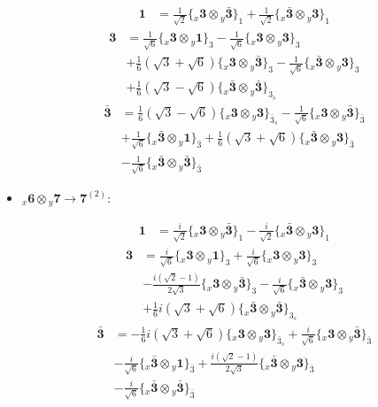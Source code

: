 \documentclass[english]{article}
\newcommand{\rep}[1]{\mathbf{#1}}
\newcommand{\repx}[2]{{}_{#2}\mathbf{#1}}
\newcommand{\tsprodx}[2]{\repx{#1}{x}\otimes\repx{#2}{y}}
\newcommand{\subcgt}[3]{\big\{ \tsprodx{#1}{#2}\big\}^{}_{#3}}
\begin{document}
\begin{itemize}
\begin{fleqn}
\begin{align*}
\rep{1} & = \frac{1}{\sqrt{2}}\subcgt{3}{\bar{3}}{1}+\frac{1}{\sqrt{2}}\subcgt{\bar{3}}{3}{1}
\end{align*}
\begin{align*}
\rep{3} & = \frac{1}{\sqrt{6}}\subcgt{3}{1}{3}-\frac{1}{\sqrt{6}}\subcgt{3}{3}{3} \\ 
 & +\frac{1}{6} \left(\sqrt{3}+\sqrt{6}\right)\subcgt{3}{\bar{3}}{3}-\frac{1}{\sqrt{6}}\subcgt{\bar{3}}{3}{3} \\ 
 & +\frac{1}{6} \left(\sqrt{3}-\sqrt{6}\right)\subcgt{\bar{3}}{\bar{3}}{3_{s}}
\end{align*}
\begin{align*}
\rep{\bar{3}} & = \frac{1}{6} \left(\sqrt{3}-\sqrt{6}\right)\subcgt{3}{3}{\bar{3}_{s}}-\frac{1}{\sqrt{6}}\subcgt{3}{\bar{3}}{\bar{3}} \\ 
 & +\frac{1}{\sqrt{6}}\subcgt{\bar{3}}{1}{\bar{3}}+\frac{1}{6} \left(\sqrt{3}+\sqrt{6}\right)\subcgt{\bar{3}}{3}{\bar{3}} \\ 
 & -\frac{1}{\sqrt{6}}\subcgt{\bar{3}}{\bar{3}}{\bar{3}}
\end{align*}
\end{fleqn}
\item $\tsprodx{6}{7}\to\rep{7}^{(2)}$:
\begin{fleqn}
\begin{align*}
\rep{1} & = \frac{i}{\sqrt{2}}\subcgt{3}{\bar{3}}{1}-\frac{i}{\sqrt{2}}\subcgt{\bar{3}}{3}{1}
\end{align*}
\begin{align*}
\rep{3} & = \frac{i}{\sqrt{6}}\subcgt{3}{1}{3}+\frac{i}{\sqrt{6}}\subcgt{3}{3}{3} \\ 
 & -\frac{i \left(\sqrt{2}-1\right)}{2 \sqrt{3}}\subcgt{3}{\bar{3}}{3}-\frac{i}{\sqrt{6}}\subcgt{\bar{3}}{3}{3} \\ 
 & +\frac{1}{6} i \left(\sqrt{3}+\sqrt{6}\right)\subcgt{\bar{3}}{\bar{3}}{3_{s}}
\end{align*}
\begin{align*}
\rep{\bar{3}} & = -\frac{1}{6} i \left(\sqrt{3}+\sqrt{6}\right)\subcgt{3}{3}{\bar{3}_{s}}+\frac{i}{\sqrt{6}}\subcgt{3}{\bar{3}}{\bar{3}} \\ 
 & -\frac{i}{\sqrt{6}}\subcgt{\bar{3}}{1}{\bar{3}}+\frac{i \left(\sqrt{2}-1\right)}{2 \sqrt{3}}\subcgt{\bar{3}}{3}{\bar{3}} \\ 
 & -\frac{i}{\sqrt{6}}\subcgt{\bar{3}}{\bar{3}}{\bar{3}}
\end{align*}

\end{fleqn}
\end{itemize}
\end{document}
